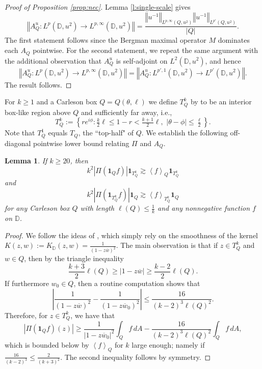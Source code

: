 \documentclass{amsart}
\newcommand{\abs}[1]{\left\vert {#1}\right\vert}
\newcommand{\norm}[1]{\left\Vert {#1}\right\Vert}
\newcommand{\avg}[1]{\left\langle {#1}\right\rangle}
\newtheorem{lemma}[theorem]{Lemma}
\theoremstyle{definition}
\numberwithin{equation}{section}
\begin{document}
\begin{proof}[Proof of Proposition \ref{prop:nec}]

Lemma \ref{l:single-scale} gives
    \[ \norm{ A_Q^u \colon L^{p}(\mathbb{D},u^2) \to L^{p,\infty}(\mathbb{D},u^2) } = \frac{\norm{ u^{-1} }_{L^{p,\infty}(Q,u^2)}\norm{u^{-1}}_{L^{p'}(Q,u^2)}}{|Q|}. \] 
    The first statement follows since the Bergman maximal operator $M$ dominates each $A_Q$ pointwise. For the second statement, we repeat the same argument with the additional observation that $A_Q^u$ is self-adjoint on $L^2(\mathbb D,u^2)$, and hence
        \[ \norm{ A_Q^u \colon L^{p}(\mathbb{D},u^2) \to L^{p,\infty}(\mathbb{D},u^2) } = \norm{ A_Q^u \colon L^{p',1}(\mathbb{D},u^2) \to L^{p'}(\mathbb{D},u^2) }.\]
    The result follows.
\end{proof}


 For $k\geq 1$ and a Carleson box $Q=Q(\theta,\ell)$  we define $T_Q^k$ by to be an interior box-like region above $Q$ and sufficiently far away, i.e., 
$$ 
    T_Q^k := \left\{re^{i\phi} \colon \tfrac{k}{2}\ell \leq 1-r < \tfrac{k+1}{2}\ell, \,\, |\theta-\phi| \le \tfrac{\ell}{2}\right\}.
$$
Note that $T_Q^1$ equals $T_Q$, the ``top-half" of $Q$. 
We establish the following off-diagonal
pointwise lower bound relating $\Pi$ and $A_Q$. 

\begin{lemma}\label{l:avg-below}
If $k \ge 20$, then
\[k^2 |\Pi (\mathbf 1_Qf)| \mathbf 1_{T_Q^k} \gtrsim \avg{f}_Q \mathbf 1_{T_Q^k}\]
and 
\[ k^2 |\Pi (\mathbf 1_{T_Q^k}f)|\mathbf  1_{Q} \gtrsim \avg{f}_{T_Q^k} \mathbf 1_Q\]
for any Carleson box $Q$ with length $\ell(Q) \le \frac{1}{k}$ and any nonnegative function $f$ on $\mathbb{D}$. 
\end{lemma}
\begin{proof}
We follow the ideas of \cites{Bek82,CF74}, which simply rely on the smoothness of the kernel $K(z,w) := K_{\mathbb{D}}(z,w) = \frac{1}{(1-z\overline{w})^2}$. The main observation is that if $z \in T_Q^k$ and $w \in Q$, then by the triangle inequality 
	\[ \frac{k+3}{2} \ell(Q) \ge |1- z \overline{w}| \ge 
	\frac{k-2}{2} \ell(Q).\] 
If furthermore $w_0 \in Q$, then a routine computation shows that 
	\[ \left\vert \frac{1}{(1- z \overline{w})^2} - \frac{1}{(1- z \overline{w}_0)^2} \right\vert \le
	\frac{16}{(k-2)^3 \ell(Q)^2}.\]
Therefore, for $z \in T_Q^k$, we have that 
	\[ \abs{\Pi (\mathbf 1_Q f)(z)} \ge \frac{1}{|1- z \overline{w}_0|^2} \int_Q f \,dA - \frac{16}{(k-2)^3 \ell(Q)^2} \int_Q f\,dA, \]
which is bounded below by $\avg{f}_Q$ for $k$ large enough; namely if $\frac{16}{(k-2)^3} \le \frac{2}{(k+3)^2}$. The second inequality follows by symmetry. 
\end{proof}
\end{document}
